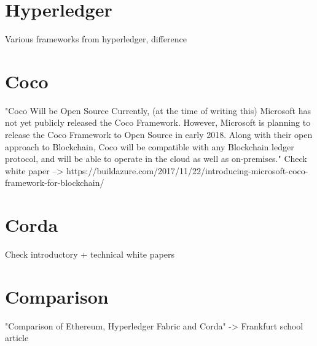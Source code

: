 \section{Hyperledger}
Various frameworks from hyperledger, difference
\section{Coco}
"Coco Will be Open Source
Currently, (at the time of writing this) Microsoft has not yet publicly released the Coco Framework. However, Microsoft is planning to release the Coco Framework to Open Source in early 2018. Along with their open approach to Blockchain, Coco will be compatible with any Blockchain ledger protocol, and will be able to operate in the cloud as well as on-premises."
Check white paper
--> https://buildazure.com/2017/11/22/introducing-microsoft-coco-framework-for-blockchain/
\section{Corda}
Check introductory + technical white papers
\section{Comparison}
"Comparison of Ethereum,
Hyperledger Fabric and
Corda" -> Frankfurt school article
